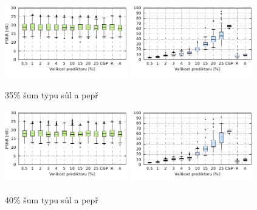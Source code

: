 \begin{figure}[H]
    \centering
    \includegraphics[width=0.475\textwidth]{fig/plot/compare/saltpepper35-100kg-psnrtest.pdf}
    \hskip0.5cm
    \includegraphics[width=0.475\textwidth]{fig/plot/compare/saltpepper35-100kg-usertime.pdf}
    \caption{35\% šum typu sůl a pepř}
\end{figure}

\begin{figure}[H]
    \centering
    \includegraphics[width=0.475\textwidth]{fig/plot/compare/saltpepper40-100kg-psnrtest.pdf}
    \hskip0.5cm
    \includegraphics[width=0.475\textwidth]{fig/plot/compare/saltpepper40-100kg-usertime.pdf}
    \caption{40\% šum typu sůl a pepř}
\end{figure}

